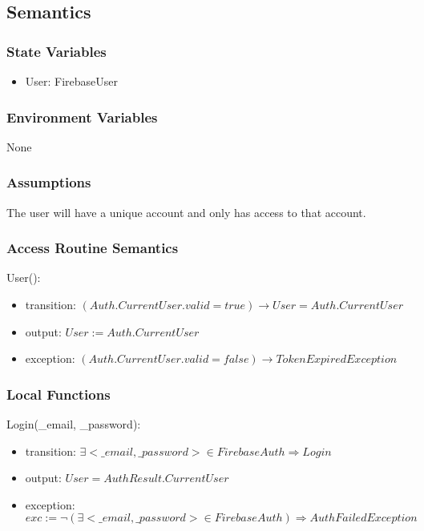 \documentclass[12pt, titlepage]{article}
\begin{document}
\subsection{Semantics}

\subsubsection{State Variables}

\begin{itemize}
\item User: FirebaseUser
\end{itemize}

\subsubsection{Environment Variables}

None

\subsubsection{Assumptions}

The user will have a unique account and only has access to that account.

\subsubsection{Access Routine Semantics}

\noindent User():
\begin{itemize}
\item transition: $(Auth.CurrentUser.valid = true) \rightarrow User = Auth.CurrentUser$ 
\item output: $User := Auth.CurrentUser$
\item exception: $(Auth.CurrentUser.valid = false) \rightarrow TokenExpiredException$
\end{itemize}

\subsubsection{Local Functions}

\noindent Login(\_email, \_password):
\begin{itemize}
\item transition: $\exists <\_email, \_password> \in FirebaseAuth \Rightarrow Login$
\item output: $User = AuthResult.CurrentUser$
\item exception: $exc:= \lnot(\exists <\_email, \_password> \in FirebaseAuth) \Rightarrow AuthFailedException$
\end{itemize}
\end{document}
